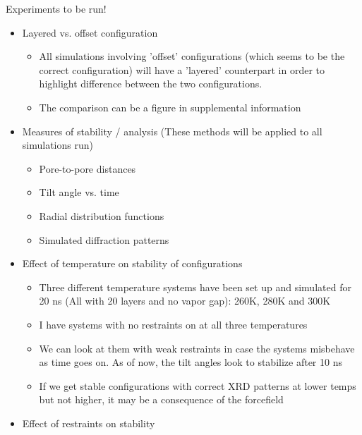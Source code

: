 \documentclass{article}
\begin{document}
        Experiments to be run!
        \begin{itemize}
                   \item Layered vs. offset configuration
                   \begin{itemize}
                        \item All simulations involving 'offset' configurations (which seems to be the correct configuration) will have a 'layered' counterpart in order to highlight difference between the two configurations.
                        \item The comparison can be a figure in supplemental information
                   \end{itemize}
                   \item Measures of stability / analysis (These methods will be applied to all simulations run)
                   \begin{itemize}
                        \item Pore-to-pore distances
                        \item Tilt angle vs. time
                        \item Radial distribution functions
                        \item Simulated diffraction patterns
                   \end{itemize}
                   \item Effect of temperature on stability of configurations
                   \begin{itemize}
                        \item Three different temperature systems have been set up and simulated for 20 ns (All with 20 layers and no vapor gap): 260K, 280K and 300K
                        \item I have systems with no restraints on at all three temperatures
                        \item We can look at them with weak restraints in case the systems misbehave as time goes on. As of now, the tilt angles look to stabilize after 10 ns
                        \item If we get stable configurations with correct XRD patterns at lower temps but not higher, it may be a consequence of the forcefield
                        \end{itemize}
                   \item Effect of restraints on stability
		   \begin{itemize}

\end{itemize}
\end{itemize}
\end{document}
